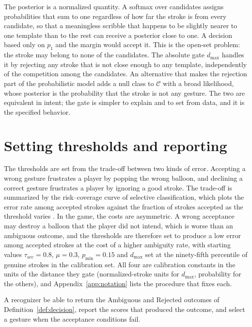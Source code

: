 The posterior is a normalized quantity. A softmax over candidates assigns probabilities that sum to one regardless of how far the stroke is from every candidate, so that a meaningless scribble that happens to be slightly nearer to one template than to the rest can receive a posterior close to one. A decision based only on $p_1$ and the margin would accept it. This is the open-set problem: the stroke may belong to none of the candidates. The absolute gate $d_{\max}$ handles it by rejecting any stroke that is not close enough to any template, independently of the competition among the candidates. An alternative that makes the rejection part of the probabilistic model adds a null class to $\mathcal C$ with a broad likelihood, whose posterior is the probability that the stroke is not any gesture. The two are equivalent in intent; the gate is simpler to explain and to set from data, and it is the specified behavior.\evS

\section{Setting thresholds and reporting}

The thresholds are set from the trade-off between two kinds of error. Accepting a wrong gesture frustrates a player by popping the wrong balloon, and declining a correct gesture frustrates a player by ignoring a good stroke. The trade-off is summarized by the risk--coverage curve of selective classification, which plots the error rate among accepted strokes against the fraction of strokes accepted as the threshold varies \cite{geifman2017}.\evD{} In the game, the costs are asymmetric. A wrong acceptance may destroy a balloon that the player did not intend, which is worse than an ambiguous outcome, and the thresholds are therefore set to produce a low error among accepted strokes at the cost of a higher ambiguity rate, with starting values $\tau_{\mathrm{acc}}=0.8$, $\mu=0.3$, $p_{\min}=0.15$ and $d_{\max}$ set at the ninety-fifth percentile of genuine strokes in the calibration set.\evS{} All four are calibration constants\evC{} in the units of the distance they gate (normalized-stroke units for $d_{\max}$, probability for the others), and Appendix~\ref{app:notation} lists the procedure that fixes each.

\begin{requirement}\label{req:non-acceptance}
A recognizer \must{} be able to return the Ambiguous and Rejected outcomes of Definition~\ref{def:decision}, \must{} report the scores that produced the outcome, and \mustnot{} select a gesture when the acceptance conditions fail.\evS
\end{requirement}

